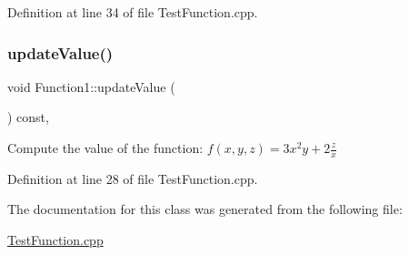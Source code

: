 Definition at line 34 of file Test\+Function.\+cpp.

\hypertarget{classFunction1_a95bc8ed2b08882cda37512e8f13fcba1}{}\label{classFunction1_a95bc8ed2b08882cda37512e8f13fcba1} 
\subsubsection{\texorpdfstring{update\+Value()}{updateValue()}}
{\footnotesize\ttfamily void Function1\+::update\+Value (\begin{DoxyParamCaption}{ }\end{DoxyParamCaption}) const\hspace{0.3cm}{\ttfamily [inline]}, {\ttfamily [protected]}}

Compute the value of the function\+: $ f(x,y,z) = 3x^2y+2\frac{z}{x}$ 

Definition at line 28 of file Test\+Function.\+cpp.



The documentation for this class was generated from the following file\+:\begin{DoxyCompactItemize}
\item 
\hyperlink{TestFunction_8cpp}{Test\+Function.\+cpp}\end{DoxyCompactItemize}
